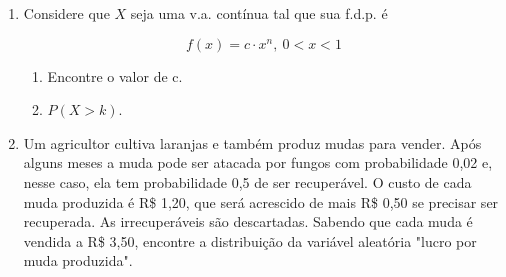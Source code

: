 \begin{enumerate}
\begin{enumerate}[label=\alph*.]
		
	\end{enumerate}
	
\item Considere que $X$ seja uma v.a. contínua tal que sua f.d.p. é

\[f(x)=c\cdot x^{n},\ 0<x<1\]

	\begin{enumerate}[label=\alph*)]
		\item Encontre o valor de c.
		
		
		\item $P(X > k)$.
		
		
	\end{enumerate}
	
\item Um agricultor cultiva laranjas e também produz mudas para vender. Após alguns meses a muda pode ser atacada por fungos com probabilidade 0,02 e, nesse caso, ela tem probabilidade 0,5 de ser recuperável. O custo de cada muda produzida é R\$ 1,20, que será acrescido de mais R\$ 0,50 se precisar ser recuperada. As irrecuperáveis são descartadas.
Sabendo que cada muda é vendida a R\$ 3,50, encontre a distribuição da variável aleatória "lucro por muda produzida".


\end{enumerate}
